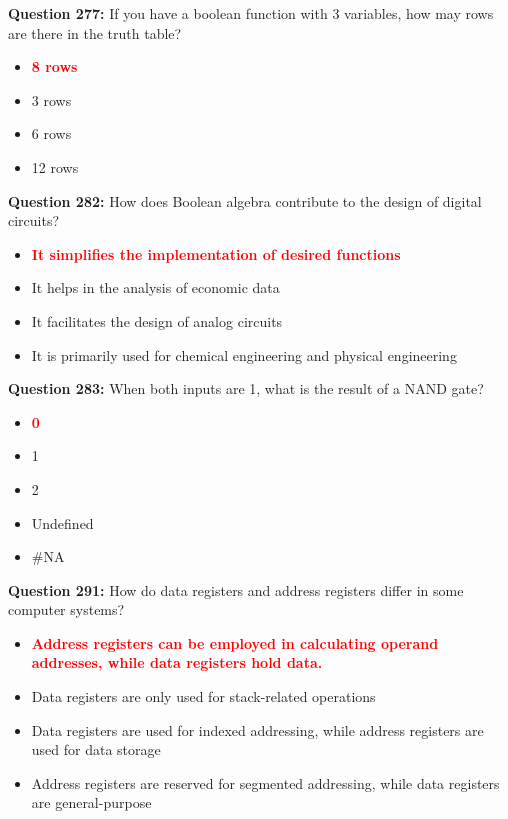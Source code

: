\documentclass[12pt,a4paper]{article}
\begin{document}
\vspace{0.5cm}

\textbf{Question 277:} If you have a boolean function with 3 variables, how may rows are there in the truth table?

\begin{itemize}
    \item[\textbf{A.}] \textcolor{red}{\textbf{8 rows}}
    \item[\textbf{B.}] 3 rows
    \item[\textbf{C.}] 6 rows
    \item[\textbf{D.}] 12 rows
\end{itemize}

\vspace{0.5cm}

\textbf{Question 282:} How does Boolean algebra contribute to the design of digital circuits?

\begin{itemize}
    \item[\textbf{A.}] \textcolor{red}{\textbf{It simplifies the implementation of desired functions}}
    \item[\textbf{B.}] It helps in the analysis of economic data
    \item[\textbf{C.}] It facilitates the design of analog circuits
    \item[\textbf{D.}] It is primarily used for chemical engineering and physical engineering
\end{itemize}

\vspace{0.5cm}

\textbf{Question 283:} When both inputs are 1, what is the result of a NAND gate?

\begin{itemize}
    \item[\textbf{A.}] \textcolor{red}{\textbf{0}}
    \item[\textbf{B.}] 1
    \item[\textbf{C.}] 2
    \item[\textbf{D.}] Undefined
    \item[\textbf{E.}] \#NA
\end{itemize}

\vspace{0.5cm}

\textbf{Question 291:} How do data registers and address registers differ in some computer systems?

\begin{itemize}
    \item[\textbf{A.}] \textcolor{red}{\textbf{Address registers can be employed in calculating operand addresses, while data registers hold data.}}
    \item[\textbf{B.}] Data registers are only used for stack-related operations
    \item[\textbf{C.}] Data registers are used for indexed addressing, while address registers are used for data storage
    \item[\textbf{D.}] Address registers are reserved for segmented addressing, while data registers are general-purpose
\end{itemize}
\end{document}
